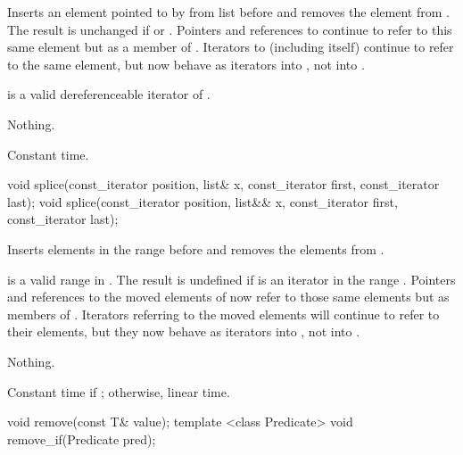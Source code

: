 \begin{itemdescr}
\pnum
\effects
Inserts an element pointed to by
from list
before  and removes the element from
.
The result is unchanged if
or
.
Pointers and references to
continue to refer to this same element but as a member of
.
Iterators
to
(including
itself) continue to refer to the same element, but now behave as iterators into
,
not into
.

\pnum
\requires
{}
is a valid dereferenceable iterator of
.

\pnum
\throws Nothing.

\pnum
\complexity
Constant time.
\end{itemdescr}

%
%
\begin{itemdecl}
void splice(const_iterator position, list& x, const_iterator first,
            const_iterator last);
void splice(const_iterator position, list&& x, const_iterator first,
            const_iterator last);
\end{itemdecl}

\begin{itemdescr}
\pnum
\effects
Inserts elements in the range
before
and removes the elements from
.

\pnum
\requires
\tcode{[first, last)}
is a valid range in
.
The result is undefined if
is an iterator in the range
.
Pointers and references to the moved elements of
now refer to those same elements but as members of
.
Iterators referring to the moved elements will continue to refer to their
elements, but they now behave as iterators into
,
not into
.

\pnum
\throws Nothing.

\pnum
\complexity
Constant time if
;
otherwise, linear time.
\end{itemdescr}

%
\begin{itemdecl}
                           void remove(const T& value);
template <class Predicate> void remove_if(Predicate pred);
\end{itemdecl}

